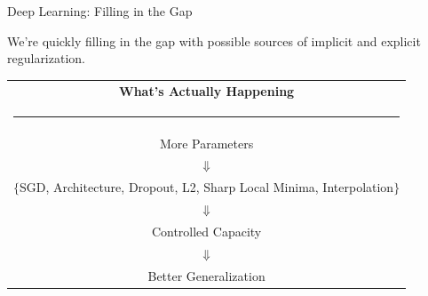 \documentclass[notheorems]{beamer}
\begin{document}
    \begin{frame}{Deep Learning: Filling in the Gap}

        \begin{center}
            \Large We're quickly filling in the gap with possible sources of implicit and explicit regularization. \vspace{-0.2cm}
        \end{center}%
        \begin{table}
            \centering
            \begin{tabular}{c}
                \textbf{What's Actually Happening}\\
                \rule{4cm}{0.025cm} \\
                More Parameters \\
                 $\Downarrow$ \\
                \hspace{-0.5cm}$\big\{$SGD, Architecture, Dropout, L2, Sharp Local Minima, Interpolation$\big\}$ \\
                $\Downarrow$ \\
                Controlled Capacity \\
                $\Downarrow$ \\
                Better Generalization \\
            \end{tabular}
        \end{table}

    \end{frame}
\end{document}
